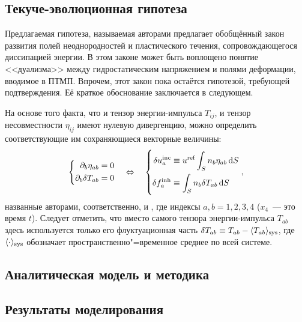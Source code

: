 \documentclass[a4paper, 14pt, titlepage]{extarticle}
\newcommand{\inc}{\textup{inc}}  %
\newcommand{\inh}{\textup{inh}}  %
\newcommand{\refer}{\textup{ref}}%
\newcommand{\sys}{\textup{sys}}  %
\begin{document}
  \subsection{Текуче-эволюционная гипотеза}

  Предлагаемая гипотеза, называемая авторами  предлагает обобщённый
  закон развития полей неоднородностей и пластического течения, сопровождающегося диссипацией
  энергии. В этом законе может быть воплощено понятие <<дуализма>> между гидростатическим
  напряжением и полями деформации, вводимое в ПТМП. Впрочем, этот закон пока остаётся гипотезой,
  требующей подтверждения. Её краткое обоснование заключается в следующем.

  На основе того факта, что и тензор энергии-импульса $T_{ij}$, и тензор несовместности $\eta_{ij}$
  имеют нулевую дивергенцию, можно определить соответствующие им сохраняющиеся векторные величины:
  \[
    \left\{
      \begin{aligned}[c]
        \partial_b \eta_{ab} &= 0\\
        \partial_b \delta T_{ab} &= 0
      \end{aligned}
    \right.
    \quad \Leftrightarrow \quad
    \left\{
      \begin{aligned}[c]
        \delta u^\inc_a &\equiv u^\refer \int_S n_b \eta_{ab} \dif S \\
        \delta f^\inh_a &\equiv \int_S n_b \delta T_{ab} \dif S
      \end{aligned}
    \right. ,
  \]
  названные авторами, соответственно,  и , где индексы $a,b = 1,2,3,4$ ($x_4$~--- это время $t$). Следует отметить, что вместо самого
  тензора энергии-импульса $T_{ab}$ здесь используется только его флуктуационная часть
  $\delta T_{ab} \equiv T_{ab} - \langle T_{ab} \rangle_\sys$, где $\langle \cdot \rangle_\sys$
  обозначает пространственно"=временное среднее по всей системе.


  \subsection{Аналитическая модель и методика}


  \subsection{Результаты моделирования}
\end{document}
